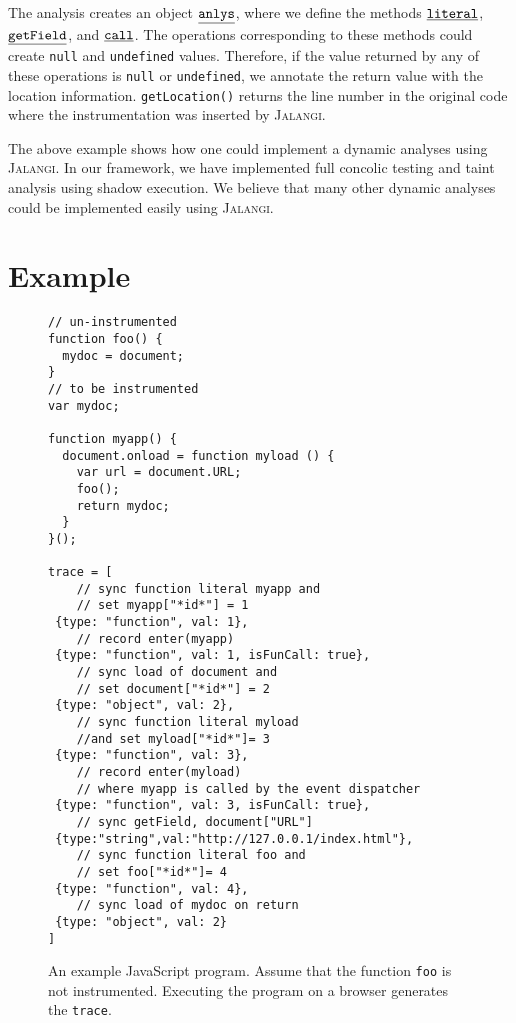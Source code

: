 \documentclass{sig-alternate}
\def\jalangi{\textsc{Jalangi}}
\newcommand \usl [1] {\mbox{\underline{\tt #1}}\xspace}
\newcommand \analysis{\usl{anlys}}
\begin{document}
The analysis creates an object $\analysis$, where we define the
methods $\usl{literal}$, $\usl{getField}$, and $\usl{call}$.  The
operations corresponding to these methods could create \texttt{null}
and \texttt{undefined} values.  Therefore, if the value returned by
any of these operations is \texttt{null} or \texttt{undefined}, we
annotate the return value with the location information.
\texttt{getLocation()} returns the line number in the original code
where the instrumentation was inserted by \jalangi{}.

The above example shows how one could implement a dynamic analyses
using \jalangi{}.  In our framework, we have implemented full concolic
testing and taint analysis using shadow execution.  We believe that
many other dynamic analyses could be implemented easily using
\jalangi{}.

\section{Example}
\label{sec:example}

\begin{figure}
 {\scriptsize
\begin{lstlisting}[mathescape]
// un-instrumented
function foo() {
  mydoc = document;
}
// to be instrumented
var mydoc;

function myapp() {
  document.onload = function myload () {
    var url = document.URL;
    foo();
    return mydoc;
  }
}();

trace = [
    // sync function literal myapp and 
    // set myapp["*id*"] = 1  
 {type: "function", val: 1},
    // record enter(myapp)
 {type: "function", val: 1, isFunCall: true}, 
    // sync load of document and 
    // set document["*id*"] = 2
 {type: "object", val: 2}, 
    // sync function literal myload 
    //and set myload["*id*"]= 3 
 {type: "function", val: 3}, 
    // record enter(myload) 
    // where myapp is called by the event dispatcher  
 {type: "function", val: 3, isFunCall: true}, 
    // sync getField, document["URL"]
 {type:"string",val:"http://127.0.0.1/index.html"}, 
    // sync function literal foo and 
    // set foo["*id*"]= 4
 {type: "function", val: 4}, 
    // sync load of mydoc on return
 {type: "object", val: 2} 
]
\end{lstlisting}
}
  \caption{An example JavaScript program.  Assume that the function
    \texttt{foo} is not instrumented.  Executing the program on a
    browser generates the \texttt{trace}.  }
  \label{fig:example}
\end{figure}
\end{document}
